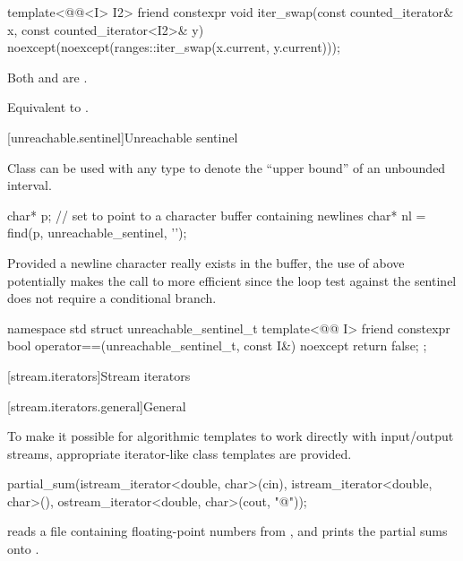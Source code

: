 %
\begin{itemdecl}
template<@@<I> I2>
  friend constexpr void
    iter_swap(const counted_iterator& x, const counted_iterator<I2>& y)
      noexcept(noexcept(ranges::iter_swap(x.current, y.current)));
\end{itemdecl}

\begin{itemdescr}
\pnum
\expects
Both  and  are .

\pnum
\effects
Equivalent to .
\end{itemdescr}

[unreachable.sentinel]{Unreachable sentinel}

%
\pnum
Class  can be used with
any  type
to denote the ``upper bound'' of an unbounded interval.

\pnum
\begin{example}
\begin{codeblock}
char* p;
// set  to point to a character buffer containing newlines
char* nl = find(p, unreachable_sentinel, '\n');
\end{codeblock}

Provided a newline character really exists in the buffer, the use of
 above potentially makes the call to  more
efficient since the loop test against the sentinel does not require a
conditional branch.
\end{example}

%
\begin{codeblock}
namespace std {
  struct unreachable_sentinel_t {
    template<@@ I>
      friend constexpr bool operator==(unreachable_sentinel_t, const I&) noexcept
      { return false; }
  };
}
\end{codeblock}

[stream.iterators]{Stream iterators}

[stream.iterators.general]{General}

\pnum
To make it possible for algorithmic templates to work directly with input/output streams, appropriate
iterator-like
class templates
are provided.

\begin{example}
\begin{codeblock}
partial_sum(istream_iterator<double, char>(cin),
  istream_iterator<double, char>(),
  ostream_iterator<double, char>(cout, "@\textbackslash@n"));
\end{codeblock}
reads a file containing floating-point numbers from
,
and prints the partial sums onto
.
\end{example}

